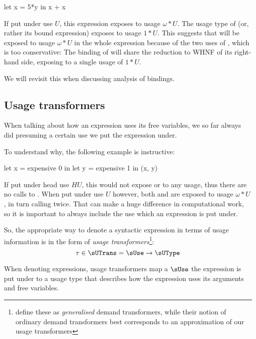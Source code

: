 \begin{haskellcode}
let x = 5*y
in x + x
\end{haskellcode}

If put under use $U$, this expression exposes  to usage $\omega*U$. 
The usage type of  (or, rather its bound expression) exposes  to usage $1*U$.
This suggests that  will be exposed to usage $\omega*U$ in the whole expression because of the two uses of , which is too conservative:
The binding of  will share the reduction to WHNF of its right-hand side, exposing  to a single usage of $1*U$.

We will revisit this when discussing analysis of  bindings.

\subsection{Usage transformers}\label{sec:utrans}

When talking about how an expression uses its free variables, we so far always did presuming a certain use we put the expression under.

To understand why, the following example is instructive:

\begin{haskellcode}
let x = expensive 0
in let y = expensive 1
   in (x, y)
\end{haskellcode}

If put under head use $HU$, this would not expose  or  to any usage, thus there are no calls to .
When put under use $U$ however, both  and  are exposed to usage $\omega*U$, in turn calling  twice.
That can make a huge difference in computational work, so it is important to always include the use which an expression is put under.

So, the appropriate way to denote a syntactic expression in terms of usage information is in the form of \emph{usage transformers}\footnote{\textcite{card} define these as \emph{generalised} demand transformers, while their notion of ordinary demand transformers best corresponds to an approximation of our usage transformers}:
\[
\tau \in \sUTrans = \sUse \to \sUType
\]

When denoting expressions, usage transformers map a $\sUse$ the expression is put under to a usage type that describes how the expression uses its arguments and free variables.

